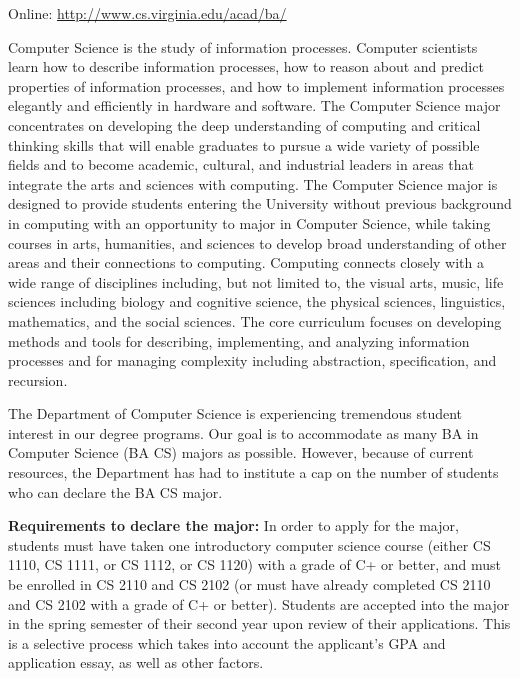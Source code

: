 \noindent Online: \url{http://www.cs.virginia.edu/acad/ba/}


Computer Science is the study of information processes. Computer
scientists learn how to describe information processes, how to reason
about and predict properties of information processes, and how to
implement information processes elegantly and efficiently in hardware
and software. The Computer Science major concentrates on developing
the deep understanding of computing and critical thinking skills that
will enable graduates to pursue a wide variety of possible fields and
to become academic, cultural, and industrial leaders in areas that
integrate the arts and sciences with computing. The Computer Science
major is designed to provide students entering the University without
previous background in computing with an opportunity to major in
Computer Science, while taking courses in arts, humanities, and
sciences to develop broad understanding of other areas and their
connections to computing. Computing connects closely with a wide range
of disciplines including, but not limited to, the visual arts, music,
life sciences including biology and cognitive science, the physical
sciences, linguistics, mathematics, and the social sciences. The core
curriculum focuses on developing methods and tools for describing,
implementing, and analyzing information processes and for managing
complexity including abstraction, specification, and recursion. 


\label{bacsapplicationprocess}

The Department of Computer Science is experiencing tremendous student
interest in our degree programs. Our goal is to accommodate as many BA
in Computer Science (BA CS) majors as possible.  However, because of
current resources, the Department has had to institute a cap on the
number of students who can declare the BA CS major.


{\bf Requirements to declare the major:} In order to apply for the
major, students must have taken one introductory computer science
course (either CS 1110, CS 1111, or CS 1112, or CS 1120) with a grade
of C+ or better, and must be enrolled in CS 2110 and CS 2102 (or must
have already completed CS 2110 and CS 2102 with a grade of C+ or
better). Students are accepted into the major in the spring semester
of their second year upon review of their applications. This is a
selective process which takes into account the applicant's GPA and
application essay, as well as other factors.

